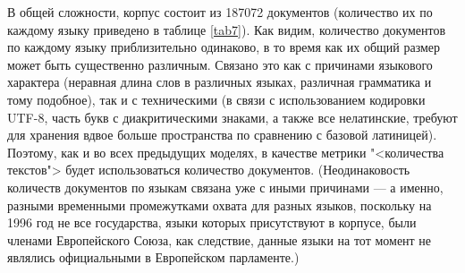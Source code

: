 В общей сложности, корпус состоит из 187072 документов (количество их по каждому языку приведено в таблице \ref{tab7}). Как видим, количество документов 
по каждому языку приблизительно одинаково, в то время как их общий размер может быть существенно различным. Связано это как с причинами языкового характера
(неравная длина слов в различных языках, различная грамматика и тому подобное), так и с техническими (в связи с использованием кодировки UTF-8, часть букв с 
диакритическими знаками, а также все нелатинские, требуют для хранения вдвое больше пространства по сравнению с базовой латиницей). Поэтому, как и во всех
предыдущих моделях, в качестве метрики "<количества текстов"> будет использоваться количество документов. (Неодинаковость количеств документов по языкам
связана уже с иными причинами --- а именно, разными временными промежутками охвата для разных языков, поскольку на 1996 год не все государства, языки которых
присутствуют в корпусе, были членами Европейского Союза, как следствие, данные языки на тот момент не являлись официальными в Европейском парламенте.)

